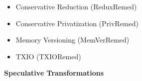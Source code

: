 \begin{itemize}
    \item Conservative Reduction (ReduxRemed)

    \item Conservative Privatization (PrivRemed)

    \item Memory Versioning (MemVerRemed)


    \item TXIO (TXIORemed)

\end{itemize}

\textbf{Speculative Transformations}

